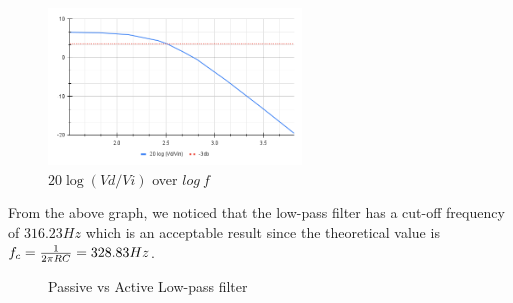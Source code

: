 \documentclass[12pt]{article}
\begin{document}
\begin{figure}[H]
    \centering
    \includegraphics[width=0.6\textwidth]{assets/ch4.png}
    \caption{$20\log(Vd/Vi)$ over $log\ f$}
\end{figure}
From the above graph, we noticed that the low-pass filter has a cut-off frequency of $316.23 Hz$ which is an acceptable result since the theoretical value is $f_c = {1 \over 2\pi RC} = 328.83 Hz$.
\begin{figure}[H]
    \centering
    \caption{Passive vs Active Low-pass filter}
\end{figure}
\end{document}
